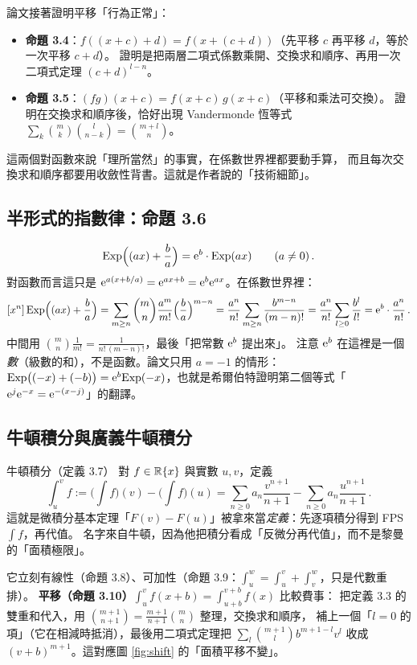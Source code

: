 論文接著證明平移「行為正常」：
\begin{itemize}
  \item \textbf{命題 3.4}：$f((x+c)+d)=f(x+(c+d))$（先平移 $c$ 再平移 $d$，等於一次平移 $c+d$）。
        證明是把兩層二項式係數乘開、交換求和順序、再用一次二項式定理 $(c+d)^{l-n}$。
  \item \textbf{命題 3.5}：$(fg)(x+c)=f(x+c)\,g(x+c)$（平移和乘法可交換）。
        證明在交換求和順序後，恰好出現 Vandermonde 恆等式 $\sum_k\binom mk\binom l{n-k}=\binom{m+l}n$。
\end{itemize}
這兩個對函數來說「理所當然」的事實，在係數世界裡都要動手算，
而且每次交換求和順序都要用收斂性背書。這就是作者說的「技術細節」。

\subsection{半形式的指數律：命題 3.6}

\[
  \mathrm{Exp}\Big((ax)+\frac ba\Big)=\mathrm{e}^{b}\cdot\mathrm{Exp}(ax)\qquad(a\neq0)\,.
\]
對函數而言這只是 $\mathrm{e}^{a(x+b/a)}=\mathrm{e}^{ax+b}=\mathrm{e}^b\mathrm{e}^{ax}$。在係數世界裡：
\[
  [x^{n}]\,\mathrm{Exp}\Big((ax)+\frac ba\Big)=\sum_{m\ge n}\binom mn\frac{a^m}{m!}\Big(\frac ba\Big)^{m-n}
  =\frac{a^n}{n!}\sum_{m\ge n}\frac{b^{m-n}}{(m-n)!}=\frac{a^n}{n!}\sum_{l\ge0}\frac{b^l}{l!}=\mathrm{e}^b\cdot\frac{a^n}{n!}\,.
\]
中間用 $\binom mn\frac1{m!}=\frac{1}{n!\,(m-n)!}$，最後「把常數 $\mathrm{e}^b$ 提出來」。
注意 $\mathrm{e}^b$ 在這裡是一個\emph{數}（級數的和），不是函數。論文只用 $a=-1$ 的情形：
$\mathrm{Exp}\big((-x)+(-b)\big)=\mathrm{e}^{b}\mathrm{Exp}(-x)$，也就是希爾伯特證明第二個等式「$\mathrm{e}^{j}\mathrm{e}^{-x}=\mathrm{e}^{-(x-j)}$」的翻譯。

\subsection{牛頓積分與廣義牛頓積分}

\begin{prereq}{牛頓積分（定義 3.7）}
對 $f\in\mathbb{R}\{x\}$ 與實數 $u,v$，定義
\[
  \int_u^{v}f:=\Big(\int f\Big)(v)-\Big(\int f\Big)(u)=\sum_{n\ge0}a_n\frac{v^{n+1}}{n+1}-\sum_{n\ge0}a_n\frac{u^{n+1}}{n+1}\,.
\]
這就是微積分基本定理「$F(v)-F(u)$」被拿來當\emph{定義}：先逐項積分得到 FPS $\int f$，再代值。
名字來自牛頓，因為他把積分看成「反微分再代值」，而不是黎曼的「面積極限」。
\end{prereq}
它立刻有線性（命題 3.8）、可加性（命題 3.9：$\int_u^w=\int_u^v+\int_v^w$，只是代數重排）。
\textbf{平移（命題 3.10）}$\int_u^{v}f(x+b)=\int_{u+b}^{v+b}f(x)$ 比較費事：
把定義 3.3 的雙重和代入，用 $\binom{m+1}{n+1}=\frac{m+1}{n+1}\binom mn$ 整理，交換求和順序，
補上一個「$l=0$ 的項」（它在相減時抵消），最後用二項式定理把 $\sum_l\binom{m+1}{l}b^{m+1-l}v^{l}$
收成 $(v+b)^{m+1}$。這對應圖 \ref{fig:shift} 的「面積平移不變」。


